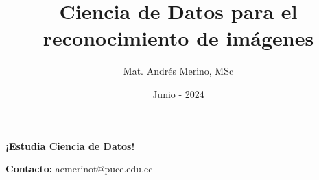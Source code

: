 \documentclass[aspectratio=169]{beamer}
\title{Ciencia de Datos para el reconocimiento de imágenes}
\author{Mat. Andrés Merino, MSc}
\institute{Carrera de Ciencia de Datos}
\date{Junio - 2024}
\begin{document}
\begin{frame}[plain]
\addtocounter{framenumber}{-1}
    \titlepage
\end{frame}

    








%     
%     

\begin{frame}[plain]
\begin{center}
    \color{white}
    {\Huge\textbf{¡Estudia Ciencia de Datos!}}

    \vspace{1cm}
    \textcolor{azul}{\textbf{Contacto:}} aemerinot@puce.edu.ec
\end{center}
\end{frame}
\end{document}
